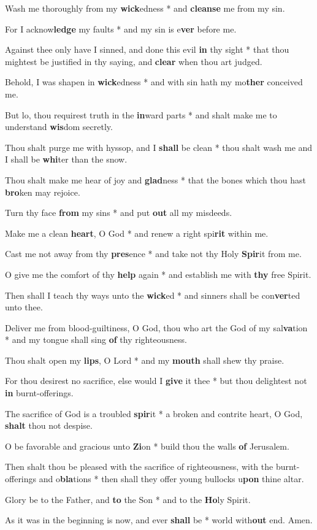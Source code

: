 \begin{multicols}{2}
	Wash me thoroughly from my \textbf{wick}edness * and \textbf{cleanse} me from my sin.
	
	For I acknow\textbf{ledge} my faults * and my sin is e\textbf{ver} before me.
	
	Against thee only have I sinned, and done this evil \textbf{in} thy sight * that thou mightest be justified in thy saying, and \textbf{clear} when thou art judged.
	
	Behold, I was shapen in \textbf{wick}edness * and with sin hath my mo\textbf{ther} conceived me.
	
	But lo, thou requirest truth in the \textbf{in}ward parts * and shalt make me to understand \textbf{wis}dom secretly.
	
	Thou shalt purge me with hyssop, and I \textbf{shall} be clean * thou shalt wash me and I shall be \textbf{whi}ter than the snow.
	
	Thou shalt make me hear of joy and \textbf{glad}ness * that the bones which thou hast \textbf{bro}ken may rejoice.
	
	Turn thy face \textbf{from} my sins * and put \textbf{out} all my misdeeds.
	
	Make me a clean \textbf{heart}, O God * and renew a right spi\textbf{rit} within me.
	
	Cast me not away from thy \textbf{pres}ence * and take not thy Holy \textbf{Spir}it from me.
	
	O give me the comfort of thy \textbf{help} again * and establish me with \textbf{thy} free Spirit.
	
	Then shall I teach thy ways unto the \textbf{wick}ed * and sinners shall be con\textbf{ver}ted unto thee.
	
	Deliver me from blood-guiltiness, O God, thou who art the God of my sal\textbf{va}tion * and my tongue shall sing \textbf{of} thy righteousness.
	
	Thou shalt open my \textbf{lips}, O Lord * and my \textbf{mouth} shall shew thy praise.
	
	For thou desirest no sacrifice, else would I \textbf{give} it thee * but thou delightest not \textbf{in} burnt-offerings.
	
	The sacrifice of God is a troubled \textbf{spir}it * a broken and contrite heart, O God, \textbf{shalt} thou not despise.
	
	O be favorable and gracious unto \textbf{Zi}on * build thou the walls \textbf{of} Jerusalem.
	
	Then shalt thou be pleased with the sacrifice of righteousness, with the burnt-offerings and o\textbf{bla}tions * then shall they offer young bullocks u\textbf{pon} thine altar.
	
	Glory be to the Father, and \textbf{to} the Son * and to the \textbf{Ho}ly Spirit.
	
	As it was in the beginning is now, and ever \textbf{shall} be * world with\textbf{out} end. Amen.
\end{multicols}
